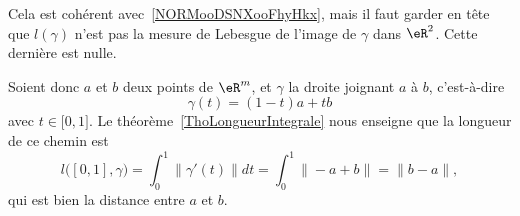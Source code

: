 \begin{remark}  \label{RemLongIntUn}
	Cela est cohérent avec~\ref{NORMooDSNXooFhyHkx}, mais il faut garder en tête que \( l(\gamma)\) n'est pas la mesure de Lebesgue de l'image de \( \gamma\) dans \( \eR^2\). Cette dernière est nulle.
\end{remark}

\begin{example}
	Soient donc \( a\) et \( b\) deux points de \( \eR^m\), et \( \gamma\) la droite joignant \( a\) à \( b\), c'est-à-dire
	\begin{equation}
		\gamma(t)=(1-t)a+tb
	\end{equation}
	avec \( t\in\mathopen[ 0 , 1 \mathclose]\). Le théorème~\ref{ThoLongueurIntegrale} nous enseigne que la longueur de ce chemin est
	\begin{equation}
		l\big( [0,1],\gamma \big)=\int_0^1\| \gamma'(t) \|dt=\int_0^1\| -a+b \|=\| b-a \|,
	\end{equation}
	qui est bien la distance entre \( a\) et \( b\).
\end{example}

